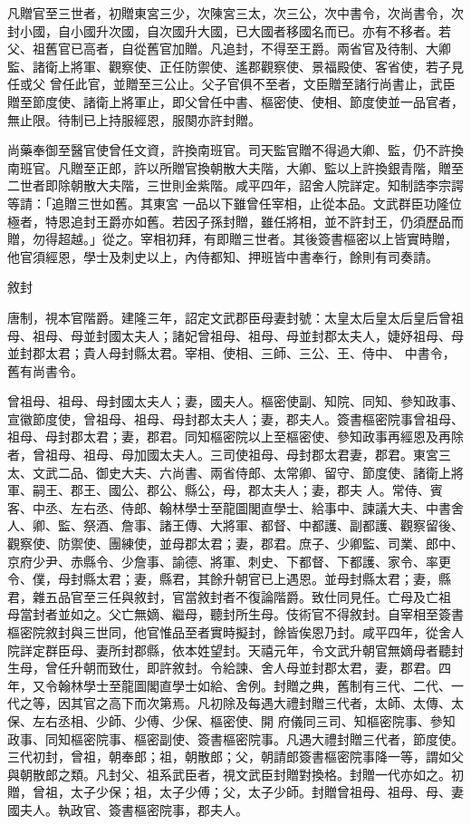 \begin{pinyinscope}
 凡贈官至三世者，初贈東宮三少，次陳宮三太，次三公，次中書令，次尚書令，次封小國，自小國升次國，自次國升大國，已大國者移國名而已。亦有不移者。若父、祖舊官已高者，自從舊官加贈。凡追封，不得至王爵。兩省官及待制、大卿監、諸衛上將軍、觀察使、正任防禦使、遙郡觀察使、景福殿使、客省使，若子見任或父
 曾任此官，並贈至三公止。父子官俱不至者，文臣贈至諸行尚書止，武臣贈至節度使、諸衛上將軍止，即父曾任中書、樞密使、使相、節度使並一品官者，無止限。待制已上持服經恩，服闋亦許封贈。



 尚藥奉御至醫官使曾任文資，許換南班官。司天監官贈不得過大卿、監，仍不許換南班官。凡贈至正郎，許以所贈官換朝散大夫階，大卿、監以上許換銀青階，贈至二世者即除朝散大夫階，三世則金紫階。咸平四年，詔舍人院詳定。知制誥李宗諤等請：「追贈三世如舊。其東宮
 一品以下雖曾任宰相，止從本品。文武群臣功隆位極者，特恩追封王爵亦如舊。若因子孫封贈，雖任將相，並不許封王，仍須歷品而贈，勿得超越。」從之。宰相初拜，有即贈三世者。其後簽書樞密以上皆實時贈，他官須經恩，學士及刺史以上，內侍都知、押班皆中書奉行，餘則有司奏請。



 敘封



 唐制，視本官階爵。建隆三年，詔定文武郡臣母妻封號：太皇太后皇太后皇后曾祖母、祖母、母並封國太夫人；諸妃曾祖母、祖母、母並封郡太夫人，婕妤祖母、母並封郡太君；貴人母封縣太君。宰相、使相、三師、三公、王、侍中、
 中書令，舊有尚書令。



 曾祖母、祖母、母封國太夫人；妻，國夫人。樞密使副、知院、同知、參知政事、宣徽節度使，曾祖母、祖母、母封郡太夫人；妻，郡夫人。簽書樞密院事曾祖母、祖母、母封郡太君；妻，郡君。同知樞密院以上至樞密使、參知政事再經恩及再除者，曾祖母、祖母、母加國太夫人。三司使祖母、母封郡太君妻，郡君。東宮三太、文武二品、御史大夫、六尚書、兩省侍郎、太常卿、留守、節度使、諸衛上將軍、嗣王、郡王、國公、郡公、縣公，母，郡太夫人；妻，郡夫
 人。常侍、賓客、中丞、左右丞、侍郎、翰林學士至龍圖閣直學士、給事中、諫議大夫、中書舍人、卿、監、祭酒、詹事、諸王傳、大將軍、都督、中都護、副都護、觀察留後、觀察使、防禦使、團練使，並母郡太君；妻，郡君。庶子、少卿監、司業、郎中、京府少尹、赤縣令、少詹事、諭德、將軍、刺史、下都督、下都護、家令、率更令、僕，母封縣太君；妻，縣君，其餘升朝官已上遇恩。並母封縣太君；妻，縣君，雜五品官至三任與敘封，官當敘封者不復論階爵。致仕同見任。亡母及亡祖
 母當封者並如之。父亡無嫡、繼母，聽封所生母。伎術官不得敘封。自宰相至簽書樞密院敘封與三世同，他官惟品至者實時擬封，餘皆俟恩乃封。咸平四年，從舍人院詳定群臣母、妻所封郡縣，依本姓望封。天禧元年，令文武升朝官無嫡母者聽封生母，曾任升朝而致仕，即許敘封。令給諫、舍人母並封郡太君，妻，郡君。四年，又令翰林學士至龍圖閣直學士如給、舍例。封贈之典，舊制有三代、二代、一代之等，因其官之高下而次第焉。凡初除及每遇大禮封贈三代者，太師、太傳、太保、左右丞相、少師、少傅、少保、樞密使、開
 府儀同三司、知樞密院事、參知政事、同知樞密院事、樞密副使、簽書樞密院事。凡遇大禮封贈三代者，節度使。三代初封，曾祖，朝奉郎；祖，朝散郎；父，朝請郎簽書樞密院事降一等，謂如父與朝散郎之類。凡封父、祖系武臣者，視文武臣封贈對換格。封贈一代亦如之。初贈，曾祖，太子少保；祖，太子少傅；父，太子少師。封贈曾祖母、祖母、母、妻國夫人。執政官、簽書樞密院事，郡夫人。




\end{pinyinscope}
